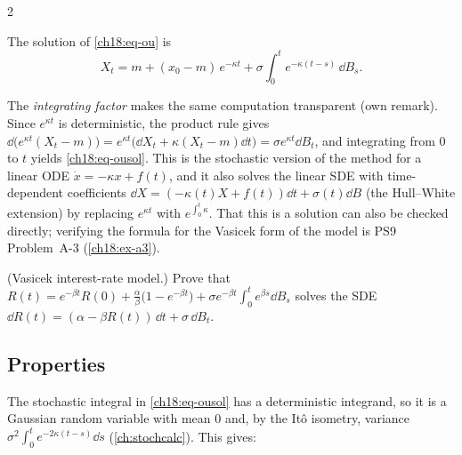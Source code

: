\begin{paracol}{2}
\begin{proposition}\label{ch18:prop-ou}
The solution of \eqref{ch18:eq-ou} is
\begin{equation}\label{ch18:eq-ousol}
  X_t=m+(x_0-m)\,e^{-\kappa t}+\sigma\int_0^te^{-\kappa(t-s)}\,\dd B_s .
\end{equation}
\end{proposition}
The \emph{integrating factor} makes the same computation transparent (own remark). Since $e^{\kappa t}$ is deterministic, the product rule gives $\dd\bigl(e^{\kappa t}(X_t-m)\bigr)=e^{\kappa t}\bigl(\dd X_t+\kappa(X_t-m)\dd t\bigr)=\sigma e^{\kappa t}\dd B_t$, and integrating from $0$ to $t$ yields \eqref{ch18:eq-ousol}. This is the stochastic version of the method for a linear ODE $\dot x=-\kappa x+f(t)$, and it also solves the linear SDE with time-dependent coefficients $\dd X=(-\kappa(t)X+f(t))\dd t+\sigma(t)\dd B$ (the Hull--White extension) by replacing $e^{\kappa t}$ with $e^{\int_0^t\kappa}$. That this is a solution can also be checked directly; verifying the formula for the Vasicek form of the model is PS9 Problem~A-3 (\cref{ch18:ex-a3}).

\begin{exercise}\label{ch18:ex-a3}
(Vasicek interest-rate model.) Prove that $R(t)=e^{-\beta t}R(0)+\frac\alpha\beta\bigl(1-e^{-\beta t}\bigr)+\sigma e^{-\beta t}\int_0^te^{\beta s}\dd B_s$ solves the SDE $\dd R(t)=(\alpha-\beta R(t))\,\dd t+\sigma\,\dd B_t$.
\end{exercise}

\subsection{Properties}
The stochastic integral in \eqref{ch18:eq-ousol} has a deterministic integrand, so it is a Gaussian random variable with mean $0$ and, by the It\^o isometry, variance $\sigma^2\int_0^te^{-2\kappa(t-s)}\dd s$ (\cref{ch:stochcalc}). This gives:


\end{paracol}
